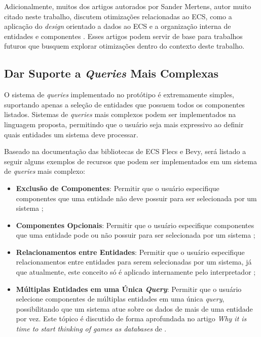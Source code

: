 Adicionalmente, muitos dos artigos autorados por Sander Mertens, autor muito citado neste trabalho, discutem otimizações relacionadas ao ECS, como a aplicação do \textit{design} orientado a dados ao ECS e a organização interna de entidades e componentes \cite{ecsfaq, ecsstorageinpics}. Esses artigos podem servir de base para trabalhos futuros que busquem explorar otimizações dentro do contexto deste trabalho.

\subsection{Dar Suporte a \textit{Queries} Mais Complexas}

O sistema de \textit{queries} implementado no protótipo é extremamente simples, suportando apenas a seleção de entidades que possuem todos os componentes listados. Sistemas de \textit{queries} mais complexos podem ser implementados na linguagem proposta, permitindo que o usuário seja mais expressivo ao definir quais entidades um sistema deve processar.

Baseado na documentação das bibliotecas de ECS Flecs e Bevy, será listado a seguir alguns exemplos de recursos que podem ser implementados em um sistema de \textit{queries} mais complexo:

\begin{itemize}
    \item \textbf{Exclusão de Componentes}: Permitir que o usuário especifique componentes que uma entidade não deve possuir para ser selecionada por um sistema \cite{flecs, bevy};
    \item \textbf{Componentes Opcionais}: Permitir que o usuário especifique componentes que uma entidade pode ou não possuir para ser selecionada por um sistema \cite{flecs, bevy};
    \item \textbf{Relacionamentos entre Entidades}: Permitir que o usuário especifique relacionamentos entre entidades para serem selecionadas por um sistema, já que atualmente, este conceito só é aplicado internamente pelo interpretador \cite{flecs, bevy};
    \item \textbf{Múltiplas Entidades em uma Única \textit{Query}}: Permitir que o usuário selecione componentes de múltiplas entidades em uma única \textit{query}, possibilitando que um sistema atue sobre os dados de mais de uma entidade por vez. Este tópico é discutido de forma aprofundada no artigo \textit{Why it is time to start thinking of games as databases} de .
\end{itemize}

